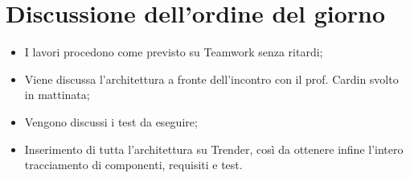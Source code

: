 \documentclass[../verbale-2017-02-28.tex]{subfiles}
\begin{document}
	\section{Discussione dell'ordine del giorno}
	\begin{itemize}
		\item I lavori procedono come previsto su Teamwork senza ritardi;
		\item Viene discussa l'architettura a fronte dell'incontro con il prof. Cardin svolto in mattinata;
		\item Vengono discussi i test da eseguire;
		\item Inserimento di tutta l'architettura su Trender, così da ottenere infine l'intero tracciamento di componenti, requisiti e test.
	\end{itemize}
\end{document}
